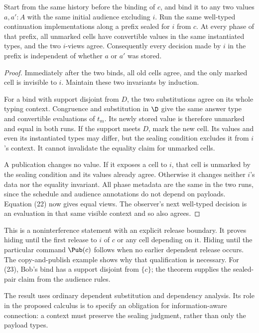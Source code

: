 \begin{theorem}
\label{thm:hiding}
Start from the same history before the binding of $c$, and bind it to any
two values $a,a':A$ with the same initial audience excluding $i$.
Run the same well-typed continuation implementations along a prefix sealed
for $i$ from $c$.
At every phase of that prefix, all unmarked cells have convertible values
in the same instantiated types, and the two $i$-views agree.
Consequently every decision made by $i$ in the prefix is independent of
whether $a$ or $a'$ was stored.
\end{theorem}
\begin{proof}
Immediately after the two binds, all old cells agree, and the only marked
cell is invisible to $i$. Maintain these two invariants by induction.

For a bind with support disjoint from $D$, the two substitutions agree on
its whole typing context. Congruence and substitution in $\D$ give the same
answer type and convertible evaluations of $t_m$. Its newly stored value is
therefore unmarked and equal in both runs. If the support meets $D$, mark
the new cell. Its values and even its instantiated types may differ, but
the sealing condition excludes it from $i$'s context. It cannot invalidate
the equality claim for unmarked cells.

A publication changes no value. If it exposes a cell to $i$, that cell is
unmarked by the sealing condition and its values already agree. Otherwise
it changes neither $i$'s data nor the equality invariant. All phase metadata
are the same in the two runs, since the schedule and audience annotations
do not depend on payloads. Equation (22) now gives equal views.
The observer's next well-typed decision is an evaluation in that same
visible context and so also agrees.
\end{proof}

This is a noninterference statement with an explicit release boundary.
It proves hiding until the first release to $i$ of $c$ or any cell
depending on it. Hiding until the particular command $\Pub(c)$ follows
when no earlier dependent release occurs. The copy-and-publish example
shows why that qualification is necessary. For (23), Bob's bind has a
support disjoint from $\{c\}$; the theorem supplies the sealed-pair claim
from the audience rules.

The result uses ordinary dependent substitution and dependency analysis.
Its role in the proposed calculus is to specify an obligation for
information-aware connection: a context must preserve the sealing judgment,
rather than only the payload types.

